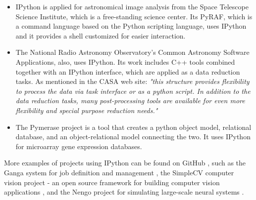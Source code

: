 \begin{itemize}
\item IPython is applied for astronomical image analysis from the Space Telescope Science Institute, which is a free-standing science center. Its PyRAF, which is a command language based on the Python scripting language, uses IPython and it provides a shell customized for easier interaction. \cite{pyRaf}

\item The National Radio Astronomy Observatory’s Common Astronomy Software Applications, also, uses IPython. Its work includes C++ tools combined together with an IPython interface, which are applied as a data reduction tasks.\cite{casa} As mentioned in the CASA web site: \textit{"this structure provides flexibility to process the data via task interface or as a python script. In addition to the data reduction tasks, many post-processing tools are available for even more flexibility and special purpose reduction needs."}\cite{casa}

\item The Pymerase project is a tool that creates a python object model, relational database, and an object-relational model connecting the two. It uses IPython for microarray gene expression databases.\cite{pymerase}

\end{itemize}

More examples of projects using IPython can be found on GitHub \cite{gitHubAlliPython}, such as the Ganga system for job definition and management \cite{ganga}, the SimpleCV computer vision project - an open source framework for building computer vision applications \cite{simpleCV}, and the Nengo project for simulating large-scale neural systems \cite{nengo}.